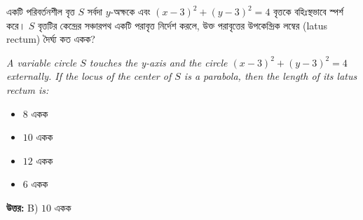 \documentclass[12pt, a4paper]{article}
\begin{document}
\begin{tcolorbox}[questionbox={প্রশ্ন (Question) 8}]
    \noindent
    একটি পরিবর্তনশীল বৃত্ত $S$ সর্বদা $y$-অক্ষকে এবং $(x-3)^2 + (y-3)^2 = 4$ বৃত্তকে বহিঃস্থভাবে স্পর্শ করে। $S$ বৃত্তটির কেন্দ্রের সঞ্চারপথ একটি পরাবৃত্ত নির্দেশ করলে, উক্ত পরাবৃত্তের উপকেন্দ্রিক লম্বের (latus rectum) দৈর্ঘ্য কত একক?
    
    \vspace{0.8em}
    \begin{english}
    \noindent\textit{\color{darkgray}
    A variable circle $S$ touches the y-axis and the circle $(x-3)^2 + (y-3)^2 = 4$ externally. If the locus of the center of $S$ is a parabola, then the length of its latus rectum is:
    }
    \end{english}
\end{tcolorbox}

\begin{itemize}[label={}, leftmargin=1cm, itemsep=0.5em]
    \item[\textbf{A)}] $8$ একক
    \item[\textbf{B)}] $10$ একক
    \item[\textbf{C)}] $12$ একক
    \item[\textbf{D)}] $6$ একক
\end{itemize}

\vspace{0.5em}
\begin{tcolorbox}[answerbox]
    \textbf{\color{success} উত্তর:} B) $10$ একক
\end{tcolorbox}
\vspace{1em}
\end{document}
